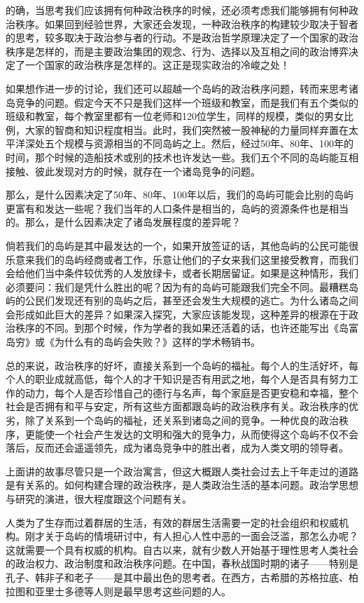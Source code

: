 的确，当思考我们应该拥有何种政治秩序的时候，还必须考虑我们能够拥有何种政治秩序。如果回到经验世界，大家还会发现，一种政治秩序的构建较少取决于智者的思考，较多取决于政治参与者的行动。不是政治哲学原理决定了一个国家的政治秩序是怎样的，而是主要政治集团的观念、行为、选择以及互相之间的政治博弈决定了一个国家的政治秩序是怎样的。这正是现实政治的冷峻之处！

如果想作进一步的讨论，我们还可以超越一个岛屿的政治秩序问题，转而来思考诸岛竞争的问题。假定今天不只是我们这样一个班级和教室，而是我们有五个类似的班级和教室，每个教室里都有一位老师和120位学生，同样的规模，类似的男女比例，大家的智商和知识程度相当。此时，我们突然被一股神秘的力量同样弃置在太平洋深处五个规模与资源相当的不同岛屿之上。然后，经过50年、80年、100年的时间，那个时候的造船技术或别的技术也许发达一些。我们五个不同的岛屿能互相接触、彼此发现对方的时候，就存在一个诸岛竞争的问题。

那么，是什么因素决定了50年、80年、100年以后，我们的岛屿可能会比别的岛屿更富有和发达一些呢？我们当年的人口条件是相当的，岛屿的资源条件也是相当的。那么，是什么因素决定了诸岛发展程度的差异呢？

倘若我们的岛屿是其中最发达的一个，如果开放签证的话，其他岛屿的公民可能很乐意来我们的岛屿经商或者工作，乐意让他们的子女来我们这里接受教育，而我们会给他们当中条件较优秀的人发放绿卡，或者长期居留证。如果是这种情形，我们必须要问：我们是凭什么胜出的呢？因为有的岛屿可能跟我们完全不同。最糟糕岛屿的公民们发现还有别的岛屿之后，甚至还会发生大规模的逃亡。为什么诸岛之间会形成如此巨大的差异？如果深入探究，大家应该能发现，这种差异的根源在于政治秩序的不同。到那个时候，作为学者的我如果还活着的话，也许还能写出《岛富岛穷》或《为什么有的岛屿会失败？》这样的学术畅销书。

总的来说，政治秩序的好坏，直接关系到一个岛屿的福祉。每个人的生活好坏，每个人的职业成就高低，每个人的才干知识是否有用武之地，每个人是否具有努力工作的动力，每个人是否珍惜自己的德行与名声，每个家庭是否更安稳和幸福，整个社会是否拥有和平与安定，所有这些方面都跟岛屿的政治秩序有关。政治秩序的优劣，除了关系到一个岛屿的福祉，还关系到诸岛之间的竞争。一种优良的政治秩序，更能使一个社会产生发达的文明和强大的竞争力，从而使得这个岛屿不仅不会落后，反而还会遥遥领先，成为诸岛竞争中的胜出者，成为人类文明的领导者。

上面讲的故事尽管只是一个政治寓言，但这大概跟人类社会过去上千年走过的道路是有关系的。如何构建合理的政治秩序，是人类政治生活的基本问题。政治学思想与研究的演进，很大程度跟这个问题有关。


人类为了生存而过着群居的生活，有效的群居生活需要一定的社会组织和权威机构。刚才关于岛屿的情境研讨中，有人担心人性中恶的一面会泛滥，那怎么办呢？这就需要一个具有权威的机构。自古以来，就有少数人开始基于理性思考人类社会的政治权力、政治制度和政治秩序问题。在中国，春秋战国时期的诸子——特别是孔子、韩非子和老子——是其中最出色的思考者。在西方，古希腊的苏格拉底、柏拉图和亚里士多德等人则是最早思考这些问题的人。

